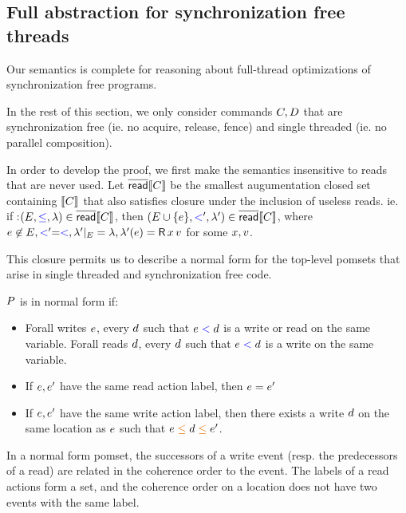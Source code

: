 \subsection{Full abstraction for synchronization free threads}
Our semantics is complete for reasoning about full-thread optimizations of synchronization free programs.

In the rest of this section, we only consider commands $C,D$ that are synchronization free (ie. no acquire, release, fence) and single threaded (ie. no parallel composition). 

In order to develop the proof, we first make the semantics insensitive to reads that are never used.  Let $\overline{\mathsf{read}}\llbracket C\rrbracket$ be the smallest augumentation closed set containing $\llbracket C\rrbracket$ that also satisfies closure under the inclusion of useless reads.  ie. if :$(E, {\mathrel{{\color{blue}\leq}}}, 
  \lambda) \in \overline{\mathsf{read}}\llbracket C\rrbracket$, then  $(E \cup \{e\}, {\mathrel{{\color{blue}<}}'},\lambda')  \in \overline{\mathsf{read}}\llbracket C\rrbracket$, where $\aEv \not \in \Event, \lt' =\lt, \labeling' \restrict \Event = \labeling, \labeling'(\aEv) = \DR{\aLoc}{\aVal}$ for some $x,v$. 

This closure permits us to  describe a normal form for the top-level pomsets that arise in single threaded and synchronization free code.  
\begin{definition}
$P$ is in normal form if:
\begin{itemize}
\item Forall writes $e$, every $d$ such that $e \mathrel{{\color{blue}<}} d$ is a write or read on the same variable.
        Forall reads  $d$, every $d$ such that $e \mathrel{{\color{blue}<}} d$ is a write on the same variable. 
    
\item If $e, e'$ have the same read action label, then $e = e'$
\item  If $e, e'$ have the same write action label, then there exists a write $d$ on the same location as $e$ such that $\aEv \gtN \bEv \gtN \aEv'$.
\end{itemize}
\end{definition}
In a normal form pomset, the successors of a write event (resp. the predecessors of a read) are related in the coherence order to the event.  The labels of a read actions form a set, and the coherence order on a location does not have two events with the same label. 

